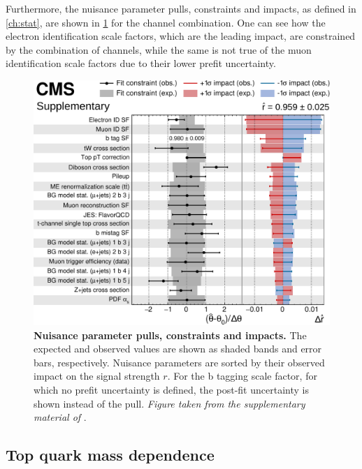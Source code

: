 Furthermore, the nuisance parameter pulls, constraints and impacts, as defined in \cref{ch:stat}, are shown in \cref{fig:ttxs:impacts} for the channel combination. One can see how the electron identification scale factors, which are the leading impact, are constrained by the combination of channels, while the same is not true of the muon identification scale factors due to their lower prefit uncertainty.

\begin{figure}[!ht]
    \centering
    \includegraphics[width=0.9\linewidth]{figures/ttxs/impacts_v2.pdf}
    \caption{\textbf{Nuisance parameter pulls, constraints and impacts.} The expected and observed values are shown as shaded bands and error bars, respectively. Nuisance parameters are sorted by their observed impact on the signal strength $r$. For the b tagging scale factor, for which no prefit uncertainty is defined, the post-fit uncertainty is shown instead of the pull. \textit{Figure taken from the supplementary material of }.}
    \label{fig:ttxs:impacts}
\end{figure}



\subsection{Top quark mass dependence}
\label{sec:ttxs:topmass}


